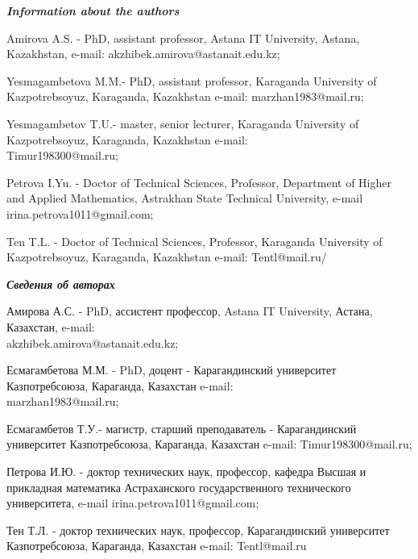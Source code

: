 \begin{authorinfo}
\emph{{\bfseries Information about the authors}}

Amirova A.S. - PhD, assistant professor, Astana IT University, Astana,
Kazakhstan, e-mail: akzhibek.amirova@astanait.edu.kz;

Yesmagambetova M.M.- PhD, assistant professor, Karaganda University of
Kazpotrebsoyuz, Karaganda, Kazakhstan e-mail: marzhan1983@mail.ru;

Yesmagambetov T.U.- master, senior lecturer, Karaganda University of
Kazpotrebsoyuz, Karaganda, Kazakhstan e-mail: \\Timur198300@mail.ru;

Petrova I.Yu. - Doctor of Technical Sciences, Professor, Department of
Higher and Applied Mathematics, Astrakhan State Technical University,
e-mail irina.petrova1011@gmail.com;

Ten T.L. - Doctor of Technical Sciences, Professor, Karaganda University
of Kazpotrebsoyuz, Karaganda, Kazakhstan e-mail: Tentl@mail.ru/

\emph{{\bfseries Сведения об авторах}}

Амирова А.С. - PhD, ассистент профессор, Astana IT University, Астана,
Казахстан, e-mail: \\akzhibek.amirova@astanait.edu.kz;

Есмагамбетова М.М. - PhD, доцент - Карагандинский университет
Казпотребсоюза, Караганда, Казахстан e-mail: \\marzhan1983@mail.ru;

Есмагамбетов Т.У.- магистр, старший преподаватель - Карагандинский
университет Казпотребсоюза, Караганда, Казахстан e-mail: Timur198300@mail.ru;

Петрова И.Ю. - доктор технических наук, профессор, кафедра Высшая и
прикладная математика Астраханского государственного
технического университета, e-mail irina.petrova1011@gmail.com;

Тен Т.Л. - доктор технических наук, профессор, Карагандинский
университет Казпотребсоюза, Караганда, Казахстан e-mail: Tentl@mail.ru
\end{authorinfo}
